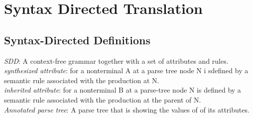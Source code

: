 \section{Syntax Directed Translation}
\subsection{Syntax-Directed Definitions}
\emph{SDD}: A context-free grammar together with a set of attributes and rules. \\
\emph{synthesized attribute}: for a nonterminal A at a parse tree node N i sdefined by a semantic rule associated with the production at N. \\
\emph{inherited attribute}: for a nonterminal B at a parse-tree node N is defined by a semantic rule associated with the production at the parent of N. \\
\emph{Annotated parse tree}: A parse tree that is showing the values of of its attributes. \\

